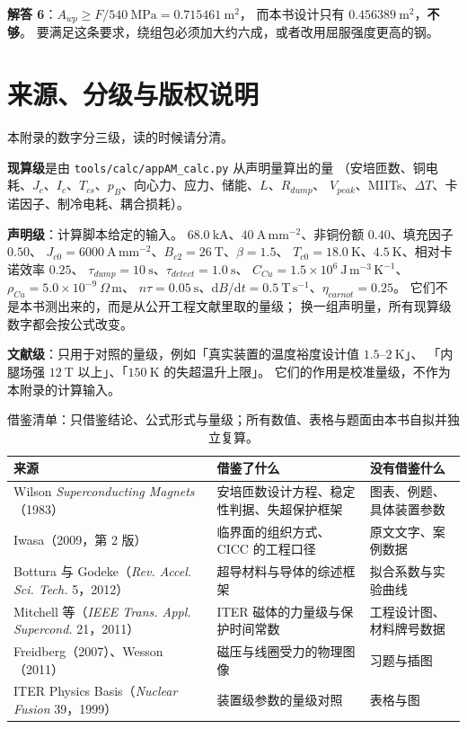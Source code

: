 \textbf{解答 6}：$A_{wp}\ge F/540\ \mathrm{MPa}=0.715461\ \mathrm{m^{2}}$，
而本书设计只有 $0.456389\ \mathrm{m^{2}}$，\textbf{不够}。
要满足这条要求，绕组包必须加大约六成，或者改用屈服强度更高的钢。

\section{来源、分级与版权说明}
\label{sec:app-am-source}

\begingroup\small
本附录的数字分三级，读的时候请分清。

\textbf{现算级}是由 \texttt{tools/\allowbreak{}calc/\allowbreak{}appAM\_calc.py} 从声明量算出的量
（安培匝数、铜电耗、$J_c$、$I_c$、$T_{cs}$、$p_B$、向心力、应力、储能、$L$、$R_{dump}$、
$V_{peak}$、MIITs、$\Delta T$、卡诺因子、制冷电耗、耦合损耗）。

\textbf{声明级}：计算脚本给定的输入。
$68.0\ \mathrm{kA}$、$40\ \mathrm{A\,mm^{-2}}$、非铜份额 $0.40$、填充因子 $0.50$、
$J_{c0}=6000\ \mathrm{A\,mm^{-2}}$、$B_{c2}=26\ \mathrm{T}$、$\beta=1.5$、
$T_{c0}=18.0\ \mathrm{K}$、$4.5\ \mathrm{K}$、相对卡诺效率 $0.25$、
$\tau_{dump}=10\ \mathrm{s}$、$\tau_{detect}=1.0\ \mathrm{s}$、
$C_{Cu}=1.5\times10^{6}\ \mathrm{J\,m^{-3}\,K^{-1}}$、$\rho_{Cu}=5.0\times10^{-9}\ \Omega\,\mathrm{m}$、
$n\tau=0.05\ \mathrm{s}$、$\mathrm{d}B/\mathrm{d}t=0.5\ \mathrm{T\,s^{-1}}$、$\eta_{carnot}=0.25$。
它们不是本书测出来的，而是从公开工程文献里取的量级；
换一组声明量，所有现算级数字都会按公式改变。

\textbf{文献级}：只用于对照的量级，例如「真实装置的温度裕度设计值 $1.5$--$2\ \mathrm{K}$」、
「内腿场强 $12\ \mathrm{T}$ 以上」、「$150\ \mathrm{K}$ 的失超温升上限」。
它们的作用是校准量级，不作为本附录的计算输入。

\begin{table}[htbp]
\centering
\small
\caption{借鉴清单：只借鉴结论、公式形式与量级；所有数值、表格与题面由本书自拟并独立复算。}
\label{tab:app-am-source}
\begin{tabular}{p{4.2cm}p{4.4cm}p{5.0cm}}
\toprule
来源 & 借鉴了什么 & 没有借鉴什么 \\
\midrule
Wilson \emph{Superconducting Magnets}（1983） & 安培匝数设计方程、稳定性判据、失超保护框架 & 图表、例题、具体装置参数 \\
Iwasa（2009，第 2 版） & 临界面的组织方式、CICC 的工程口径 & 原文文字、案例数据 \\
Bottura 与 Godeke（\emph{Rev. Accel. Sci. Tech.} 5，2012） & 超导材料与导体的综述框架 & 拟合系数与实验曲线 \\
Mitchell 等（\emph{IEEE Trans. Appl. Supercond.} 21，2011） & ITER 磁体的力量级与保护时间常数 & 工程设计图、材料牌号数据 \\
Freidberg（2007）、Wesson（2011） & 磁压与线圈受力的物理图像 & 习题与插图 \\
ITER Physics Basis（\emph{Nuclear Fusion} 39，1999） & 装置级参数的量级对照 & 表格与图 \\
\bottomrule
\end{tabular}

\end{table}

